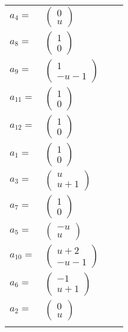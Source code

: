 \documentclass[1p]{elsarticle_modified}
\theoremstyle{definition}
\begin{document}
\begin{tabular}{m{7pt} m{180pt} m{7pt} m{180pt} }
\flushright $a_{4}=$&$\begin{pmatrix}0\\u\end{pmatrix}$ \\
\flushright $a_{8}=$&$\begin{pmatrix}1\\0\end{pmatrix}$ \\
\flushright $a_{9}=$&$\begin{pmatrix}1\\- u-1\end{pmatrix}$ \\
\flushright $a_{11}=$&$\begin{pmatrix}1\\0\end{pmatrix}$ \\
\flushright $a_{12}=$&$\begin{pmatrix}1\\0\end{pmatrix}$ \\
\flushright $a_{1}=$&$\begin{pmatrix}1\\0\end{pmatrix}$ \\
\flushright $a_{3}=$&$\begin{pmatrix}u\\u+1\end{pmatrix}$ \\
\flushright $a_{7}=$&$\begin{pmatrix}1\\0\end{pmatrix}$ \\
\flushright $a_{5}=$&$\begin{pmatrix}- u\\u\end{pmatrix}$ \\
\flushright $a_{10}=$&$\begin{pmatrix}u+2\\- u-1\end{pmatrix}$ \\
\flushright $a_{6}=$&$\begin{pmatrix}-1\\u+1\end{pmatrix}$ \\
\flushright $a_{2}=$&$\begin{pmatrix}0\\u\end{pmatrix}$\\&\end{tabular}
\end{document}
